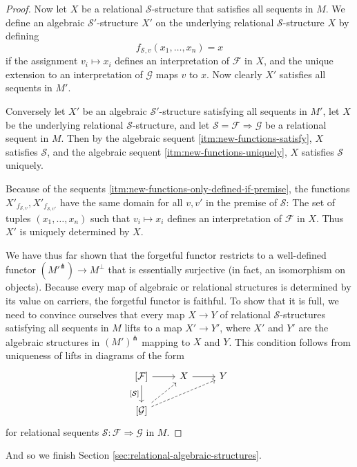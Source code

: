 \documentclass[a4paper]{article}
\theoremstyle{remark}
\theoremstyle{definition}
\begin{document}
\begin{proof}
  Now let $X$ be a relational $\mathcal{S}$-structure that satisfies all sequents in $M$.
  We define an algebraic $\mathcal{S}'$-structure $X'$ on the underlying relational $\mathcal{S}$-structure $X$ by defining
  \begin{equation}
    f_{\mathcal{S}, v}(x_1, \dots, x_n) = x
  \end{equation}
  if the assignment $v_i \mapsto x_i$ defines an interpretation of $\mathcal{F}$ in $X$, and the unique extension to an interpretation of $\mathcal{G}$ maps $v$ to $x$.
  Now clearly $X'$ satisfies all sequents in $M'$.
  
  Conversely let $X'$ be an algebraic $\mathcal{S}'$-structure satisfying all sequents in $M'$, let $X$ be the underlying relational $\mathcal{S}$-structure, and let $\mathcal{S} = \mathcal{F} \Rightarrow \mathcal{G}$ be a relational sequent in $M$.
  Then by the algebraic sequent \ref{itm:new-functions-satisfy}, $X$ satisfies $\mathcal{S}$, and the algebraic sequent \ref{itm:new-functions-uniquely}, $X$ satisfies $\mathcal{S}$ uniquely.

  Because of the sequents \ref{itm:new-functions-only-defined-if-premise}, the functions $X'_{f_{\mathcal{S}, v}}, X'_{f_{\mathcal{S}, v'}}$ have the same domain for all $v, v'$ in the premise of $\mathcal{S}$:
  The set of tuples $(x_1, \dots, x_n)$ such that $v_i \mapsto x_i$ defines an interpretation of $\mathcal{F}$ in $X$.
  Thus $X'$ is uniquely determined by $X$.

  We have thus far shown that the forgetful functor restricts to a well-defined functor $(M'^\pitchfork) \rightarrow M^\perp$ that is essentially surjective (in fact, an isomorphism on objects).
  Because every map of algebraic or relational structures is determined by its value on carriers, the forgetful functor is faithful.
  To show that it is full, we need to convince ourselves that every map $X \rightarrow Y$ of relational $\mathcal{S}$-structures satisfying all sequents in $M$ lifts to a map $X' \rightarrow Y'$, where $X'$ and $Y'$ are the algebraic structures in $(M')^\pitchfork$ mapping to $X$ and $Y$.
  This condition follows from uniqueness of lifts in diagrams of the form
  \begin{equation}
    \begin{tikzcd}
      \left[ \mathcal{F} \right] \arrow[d, "{[\mathcal{S}]}"'] \arrow[r] & X \arrow[r] & Y \\
      \left[ \mathcal{G} \right] \arrow[ur, dashed] \arrow[urr, dashed]
    \end{tikzcd}
  \end{equation}
  for relational sequents $\mathcal{S} : \mathcal{F} \Rightarrow \mathcal{G}$ in $M$.
\end{proof}

And so we finish Section \ref{sec:relational-algebraic-structures}.



\end{document}
